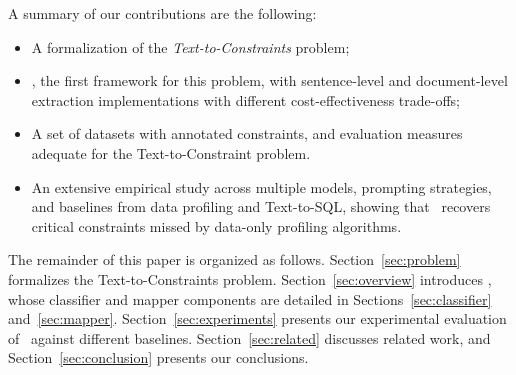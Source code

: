 A summary of our contributions are the following:
\begin{itemize}[leftmargin=0.35cm]
\item A formalization of the \emph{Text-to-Constraints} problem;
\item \system, the first framework for this problem, with sentence-level and document-level extraction implementations with different cost-effectiveness trade-offs;
\item A set of datasets with annotated constraints, and evaluation measures adequate for the Text-to-Constraint problem.
\item An extensive empirical study across multiple models, prompting strategies, and baselines from data profiling and Text-to-SQL, showing that \system\ recovers critical constraints missed by data-only profiling algorithms.
\end{itemize}

The remainder of this paper is organized as follows. Section~\ref{sec:problem} formalizes the Text-to-Constraints problem. Section~\ref{sec:overview} introduces \system, whose classifier and mapper components are detailed in Sections~\ref{sec:classifier} and~\ref{sec:mapper}. Section~\ref{sec:experiments} presents our experimental evaluation of \system\ against different baselines. Section~\ref{sec:related} discusses related work, and Section~\ref{sec:conclusion} presents our conclusions.









